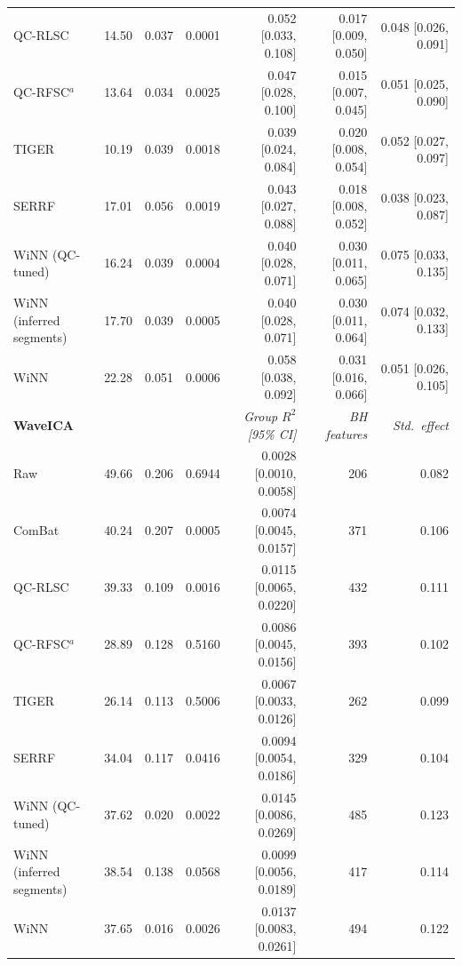 \begin{landscape}
\begin{longtable}{lrrrrrr}
QC-RLSC & 14.50 & 0.037 & 0.0001 & 0.052 [0.033, 0.108] & 0.017 [0.009, 0.050] & 0.048 [0.026, 0.091] \\
QC-RFSC$^{a}$ & 13.64 & 0.034 & 0.0025 & 0.047 [0.028, 0.100] & 0.015 [0.007, 0.045] & 0.051 [0.025, 0.090] \\
TIGER & 10.19 & 0.039 & 0.0018 & 0.039 [0.024, 0.084] & 0.020 [0.008, 0.054] & 0.052 [0.027, 0.097] \\
SERRF & 17.01 & 0.056 & 0.0019 & 0.043 [0.027, 0.088] & 0.018 [0.008, 0.052] & 0.038 [0.023, 0.087] \\
WiNN (QC-tuned) & 16.24 & 0.039 & 0.0004 & 0.040 [0.028, 0.071] & 0.030 [0.011, 0.065] & 0.075 [0.033, 0.135] \\
WiNN (inferred segments) & 17.70 & 0.039 & 0.0005 & 0.040 [0.028, 0.071] & 0.030 [0.011, 0.064] & 0.074 [0.032, 0.133] \\
WiNN & 22.28 & 0.051 & 0.0006 & 0.058 [0.038, 0.092] & 0.031 [0.016, 0.066] & 0.051 [0.026, 0.105] \\
\midrule
\multicolumn{4}{l}{\textbf{WaveICA}} & \textit{Group $R^2$ [95\% CI]} & \textit{BH features} & \textit{Std.\ effect} \\
\midrule
Raw & 49.66 & 0.206 & 0.6944 & 0.0028 [0.0010, 0.0058] & 206 & 0.082 \\
ComBat & 40.24 & 0.207 & 0.0005 & 0.0074 [0.0045, 0.0157] & 371 & 0.106 \\
QC-RLSC & 39.33 & 0.109 & 0.0016 & 0.0115 [0.0065, 0.0220] & 432 & 0.111 \\
QC-RFSC$^{a}$ & 28.89 & 0.128 & 0.5160 & 0.0086 [0.0045, 0.0156] & 393 & 0.102 \\
TIGER & 26.14 & 0.113 & 0.5006 & 0.0067 [0.0033, 0.0126] & 262 & 0.099 \\
SERRF & 34.04 & 0.117 & 0.0416 & 0.0094 [0.0054, 0.0186] & 329 & 0.104 \\
WiNN (QC-tuned) & 37.62 & 0.020 & 0.0022 & 0.0145 [0.0086, 0.0269] & 485 & 0.123 \\
WiNN (inferred segments) & 38.54 & 0.138 & 0.0568 & 0.0099 [0.0056, 0.0189] & 417 & 0.114 \\
WiNN & 37.65 & 0.016 & 0.0026 & 0.0137 [0.0083, 0.0261] & 494 & 0.122 \\
\end{longtable}
\end{landscape}
